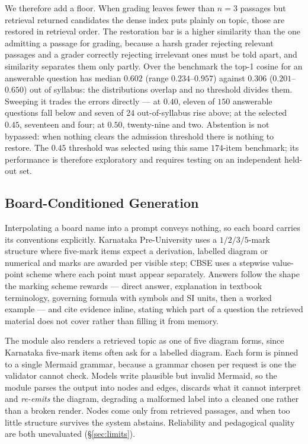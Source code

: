 \documentclass[conference]{IEEEtran}
\begin{document}
We therefore add a floor. When grading leaves fewer than $n=3$ passages but
retrieval returned candidates the dense index puts plainly on topic, those are
restored in retrieval order. The restoration bar is a higher similarity than the
one admitting a passage for grading, because a harsh grader rejecting relevant
passages and a grader correctly rejecting irrelevant ones must be told apart,
and similarity separates them only partly. Over the benchmark the top-1 cosine
for an answerable question has median $0.602$ (range $0.234$--$0.957$) against
$0.306$ ($0.201$--$0.650$) out of syllabus: the distributions overlap and no
threshold divides them. Sweeping it trades the errors directly --- at $0.40$,
eleven of $150$ answerable questions fall below and seven of $24$
out-of-syllabus rise above; at the selected $0.45$, seventeen and four; at
$0.50$, twenty-nine and two. Abstention is not bypassed: when nothing clears the
admission threshold there is nothing to restore. The $0.45$ threshold was
selected using this same $174$-item benchmark; its performance is therefore
exploratory and requires testing on an independent held-out set.

\subsection{Board-Conditioned Generation}
\label{sec:diagram}
Interpolating a board name into a prompt conveys nothing, so each board carries
its conventions explicitly. Karnataka Pre-University uses a $1/2/3/5$-mark
structure where five-mark items expect a derivation, labelled diagram or
numerical and marks are awarded per visible step; CBSE uses a stepwise
value-point scheme where each point must appear separately. Answers follow the
shape the marking scheme rewards --- direct answer, explanation in textbook
terminology, governing formula with symbols and SI units, then a worked example
--- and cite evidence inline, stating which part of a question the retrieved
material does not cover rather than filling it from memory.

The module also renders a retrieved topic as one of five diagram forms, since
Karnataka five-mark items often ask for a labelled diagram. Each form is pinned
to a single Mermaid grammar, because a grammar chosen per request is one the
validator cannot check. Models write plausible but invalid Mermaid, so the
module parses the output into nodes and edges, discards what it cannot interpret
and \emph{re-emits} the diagram, degrading a malformed label into a cleaned one
rather than a broken render. Nodes come only from retrieved passages, and when
too little structure survives the system abstains. Reliability and pedagogical
quality are both unevaluated (§\ref{sec:limits}).
\end{document}
